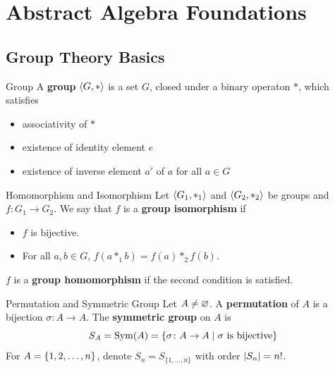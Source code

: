 \documentclass[12pt,a4paper]{article}
\begin{document}
    \maketitle
    \newpage
    \tableofcontents    
    \newpage


    \setcounter{section}{-1}
    \section{Abstract Algebra Foundations}
    \subsection{Group Theory Basics}
    
    \begin{defi}{Group}
        A \textbf{group} $\langle G,* \rangle$ is a set $G$, closed under a binary operaton $*$, which satisfies 
        \begin{itemize}
            \item associativity of $*$
            \item existence of identity element $e$
            \item existence of inverse element $a'$ of $a$ for all $a\in G$ 
        \end{itemize}
    \end{defi}
    \bigskip

    \begin{defi}{Homomorphism and Isomorphism}
        Let $\langle G_1,*_1 \rangle$ and $\langle G_2,*_2 \rangle$ be groups and $f:G_1\to G_2$. We say that $f$ is a \textbf{group isomorphism} if
        \begin{itemize}
            \item $f$ is bijective.
            \item For all $a,b\in G$, $f(a*_1b)=f(a)*_2f(b)$.
        \end{itemize}
        $f$ is a \textbf{group homomorphism} if the second condition is satisfied.
    \end{defi}
    \bigskip
    
    \begin{defi}{Permutation and Symmetric Group}
        Let $A \neq \varnothing$. A \textbf{permutation} of $A$ is a bijection $\sigma \colon A \to A$. The \textbf{symmetric group} on $A$ is
        \[
            S_A = \operatorname{Sym}(A) = \left\{ \sigma \colon A \to A \mid \sigma \text{ is bijective} \right\}
        \]
        For $A = \left\{ 1, 2, \ldots, n \right\}$, denote $S_n = S_{\{1,\ldots,n\}}$ with order $\left\lvert S_n \right\rvert = n!$.
    \end{defi}
    \bigskip
    
\end{document}
